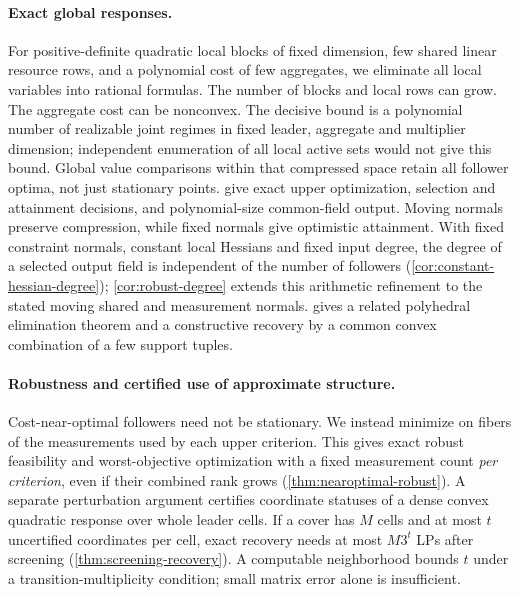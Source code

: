 \paragraph{Exact global responses.}
For positive-definite quadratic local blocks of fixed dimension, few shared
linear resource rows, and a polynomial cost of few aggregates, we eliminate
all local variables into rational formulas. The number of blocks and local
rows can grow. The aggregate cost can be nonconvex. The decisive bound is a
polynomial number of realizable joint regimes in fixed leader, aggregate and
multiplier dimension; independent enumeration of all local active sets would
not give this bound. Global value comparisons within that compressed space
retain all follower optima, not just stationary points.
 give exact upper optimization,
selection and attainment decisions, and polynomial-size common-field output.
Moving normals preserve compression, while fixed normals give optimistic
attainment. With fixed constraint normals, constant local Hessians and fixed input degree,
the degree of a selected output field is independent of the number of followers
(\cref{cor:constant-hessian-degree}); \cref{cor:robust-degree} extends this
arithmetic refinement to the stated moving shared and measurement normals.
 gives a related polyhedral elimination theorem and a
constructive recovery by a common convex combination of a few support tuples.

\paragraph{Robustness and certified use of approximate structure.}
Cost-near-optimal followers need not be stationary. We instead minimize on
fibers of the measurements used by each upper criterion. This gives exact
robust feasibility and worst-objective optimization with a fixed measurement
count \emph{per criterion}, even if their combined rank grows
(\cref{thm:nearoptimal-robust}). A separate perturbation argument certifies
coordinate statuses of a dense convex quadratic response over whole leader
cells. If a cover has $M$ cells and at most $t$ uncertified coordinates per
cell, exact recovery needs at most $M3^t$ LPs after screening
(\cref{thm:screening-recovery}). A computable neighborhood bounds $t$ under a
transition-multiplicity condition; small matrix error alone is insufficient.


